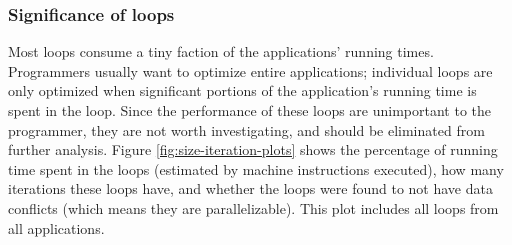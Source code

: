 \documentclass[12pt,twoside]{reedthesis}
\begin{document}
		\subsubsection{Significance of loops}
		
		Most loops consume a tiny faction of the applications' running times. Programmers usually want to optimize entire applications; individual loops are only optimized when significant portions of the application's running time is spent in the loop. Since the performance of these loops are unimportant to the programmer, they are not worth investigating, and should be eliminated from further analysis.  
		Figure \ref{fig:size-iteration-plots} shows the percentage of running time spent in the loops (estimated by machine instructions executed), how many iterations these loops have, and whether the loops were found to not have data conflicts (which means they are parallelizable). This plot includes all loops from all applications. 
		
		
\end{document}
